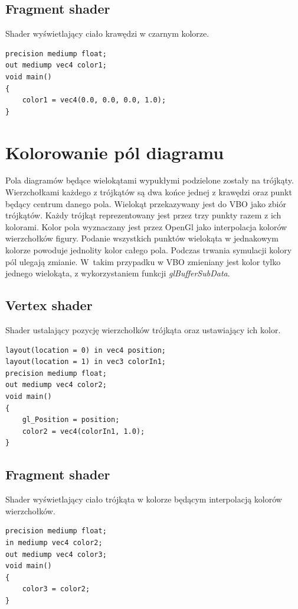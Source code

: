 \documentclass[declaration,shortabstract, inz]{iithesis}
\theoremstyle{definition} \newtheorem{definition}{Definicja}[]
\theoremstyle{plain} \newtheorem{remark}[definition]{Obserwacja}
\theoremstyle{plain} \newtheorem{theorem}[definition]{Twierdzenie}
\theoremstyle{plain} \newtheorem{example}{Przykład}[definition]
\theoremstyle{plain} \newtheorem{lemma}[definition]{Lemat}
\begin{document}
\subsection{Fragment shader}
Shader wyświetlający ciało krawędzi w czarnym kolorze.
\begin{center}
\begin{lstlisting}
precision mediump float;
out mediump vec4 color1;
void main()
{
	color1 = vec4(0.0, 0.0, 0.0, 1.0);
}
\end{lstlisting}
\end{center}

\section{Kolorowanie pól diagramu}

Pola diagramów będące wielokątami wypukłymi podzielone zostały na trójkąty. Wierzchołkami każdego z trójkątów są dwa końce jednej z krawędzi oraz punkt będący centrum danego pola. Wielokąt przekazywany jest do VBO jako zbiór trójkątów. Każdy trójkąt reprezentowany jest przez trzy punkty razem z ich kolorami. Kolor pola wyznaczany jest przez OpenGl jako interpolacja kolorów wierzchołków figury. Podanie wszystkich punktów wielokąta w jednakowym kolorze powoduje jednolity kolor całego pola. Podczas trwania symulacji kolory pól ulegają zmianie. W~takim przypadku w VBO zmieniany jest kolor tylko jednego wielokąta, z wykorzystaniem funkcji \textit{glBufferSubData}.

\subsection{Vertex shader}
Shader ustalający pozycję wierzchołków trójkąta oraz ustawiający ich kolor.
\begin{center}
\begin{lstlisting}
layout(location = 0) in vec4 position;
layout(location = 1) in vec3 colorIn1;
precision mediump float;
out mediump vec4 color2;
void main()
{
	gl_Position = position;
	color2 = vec4(colorIn1, 1.0);
}
\end{lstlisting}
\end{center}

\newpage

\subsection{Fragment shader}
Shader wyświetlający ciało trójkąta w kolorze będącym interpolacją kolorów wierzchołków.
\begin{center}
\begin{lstlisting}
precision mediump float;
in mediump vec4 color2;
out mediump vec4 color3;
void main()
{
	color3 = color2;
}
\end{lstlisting}
\end{center}
\end{document}
